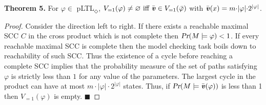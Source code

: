 \documentclass{llncs}
\renewcommand{\Pr}{\mbox{\rm Pr}}
\renewcommand{\Pr}{\mbox{\sl Pr}}
\renewcommand{\emptyset}{\varnothing}
\renewcommand{\a}[1]{\textbf{\textit{#1}}}
\newcommand{\ve}{{{\a v}}}
\newcommand{\de}{\Diamond}
\begin{document}
\section{}
\noindent
\textbf{Theorem 5.} 
For $\varphi\in$ pLTL$_\de$, $V_{= 1}(\varphi) \neq \emptyset \mbox{ iff } \bar{ {\a v}} \in V_{= 1}(\bar\varphi)$ with $\bar{ {\a v}}(x) = m{\cdot}|\varphi|{\cdot}2^{|\varphi|}$.
\begin{proof} Consider the direction left to right.
 If there exists a reachable maximal SCC $C$ in the cross product  which is not complete then $\Pr(M\models \varphi)<1$. If every reachable maximal SCC is complete then the model checking task boils down to 
 reachability of such SCC. Thus the existence of a cycle before reaching a complete SCC implies that the probability measure of the set of paths satisfying $\varphi$ is strictly less than $1$ for any 
 value of the parameters. The largest cycle in the product can have at most $m{\cdot}|\varphi|{\cdot}2^{|\varphi|}$ states. Thus, if $\Pr(M\models \bar\ve(\varphi))$ is less than 1 then $V_{=1}(\varphi)$ is empty.
 \hfill $\blacksquare$\end{proof}
 
\end{document}

